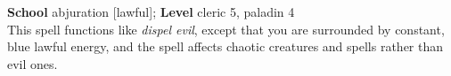 \textbf{School} abjuration [lawful]; \textbf{Level} cleric 5, paladin 4\\
This spell functions like \textit{dispel evil}, except that you are surrounded by constant, blue lawful energy, and the spell affects chaotic creatures and spells rather than evil ones.\\

